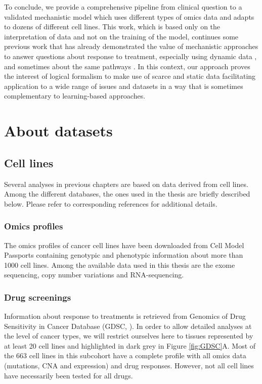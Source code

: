 \documentclass[a4paper,12pt,twoside,onecolumn,openright,final,oldfontcommands]{memoir}
\begin{document}
To conclude, we provide a comprehensive pipeline from clinical question
to a validated mechanistic model which uses different types of omics
data and adapts to dozens of different cell lines. This work, which is
based only on the interpretation of data and not on the training of the
model, continues some previous work that has already demonstrated the
value of mechanistic approaches to answer questions about response to
treatment, especially using dynamic data \citep{saez2020personalized},
and sometimes about the same pathways \citep{klinger2013network}. In
this context, our approach proves the interest of logical formalism to
make use of scarce and static data facilitating application to a wide
range of issues and datasets in a way that is sometimes complementary to
learning-based approaches.

\appendix {}


\chapter{About datasets}\label{appendix-datasets}

\section{Cell lines}\label{appendix-cl}

Several analyses in previous chapters are based on data derived from
cell lines. Among the different databases, the ones used in the thesis
are briefly described below. Please refer to corresponding references
for additional details.

\subsection{Omics profiles}\label{omics-profiles}

The omics profiles of cancer cell lines have been downloaded from Cell
Model Passports \citep{van2019cell} containing genotypic and phenotypic
information about more than 1000 cell lines. Among the available data
used in this thesis are the exome sequencing, copy number variations and
RNA-sequencing.

\subsection{Drug screenings}\label{appendix-GDSC}

Information about response to treatments is retrieved from Genomics of
Drug Sensitivity in Cancer Database (GDSC, \citet{yang2012genomics}). In
order to allow detailed analyses at the level of cancer types, we will
restrict ourselves here to tissues represented by at least 20 cell lines
and highlighted in dark grey in Figure \ref{fig:GDSC}A. Most of the 663
cell lines in this subcohort have a complete profile with all omics data
(mutations, CNA and expression) and drug responses. However, not all
cell lines have necessarily been tested for all drugs.
\end{document}
